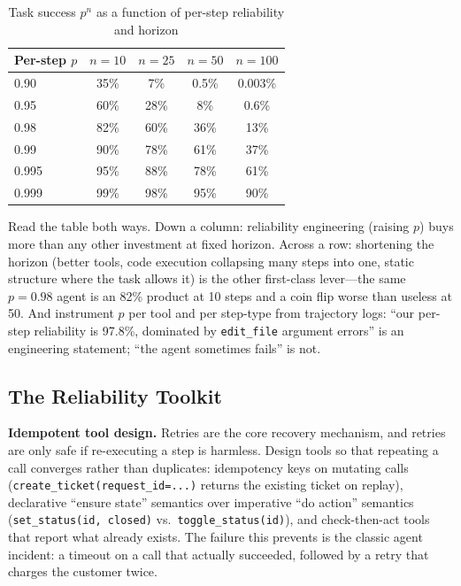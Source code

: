 \begin{table}[H]
\centering
\caption{Task success $p^n$ as a function of per-step reliability and horizon}
\label{tab:pn_grid}
\begin{tabular}{lcccc}
\toprule
\textbf{Per-step $p$} & $n=10$ & $n=25$ & $n=50$ & $n=100$ \\
\midrule
0.90 & 35\% & 7\% & 0.5\% & 0.003\% \\
0.95 & 60\% & 28\% & 8\% & 0.6\% \\
0.98 & 82\% & 60\% & 36\% & 13\% \\
0.99 & 90\% & 78\% & 61\% & 37\% \\
0.995 & 95\% & 88\% & 78\% & 61\% \\
0.999 & 99\% & 98\% & 95\% & 90\% \\
\bottomrule
\end{tabular}
\end{table}

Read the table both ways. Down a column: reliability engineering (raising $p$) buys more than any other investment at fixed horizon. Across a row: shortening the horizon (better tools, code execution collapsing many steps into one, static structure where the task allows it) is the other first-class lever---the same $p = 0.98$ agent is an 82\% product at 10 steps and a coin flip worse than useless at 50. And instrument $p$ per tool and per step-type from trajectory logs: ``our per-step reliability is 97.8\%, dominated by \texttt{edit\_file} argument errors'' is an engineering statement; ``the agent sometimes fails'' is not.

\subsection{The Reliability Toolkit}

\textbf{Idempotent tool design.} Retries are the core recovery mechanism, and retries are only safe if re-executing a step is harmless. Design tools so that repeating a call converges rather than duplicates: idempotency keys on mutating calls (\texttt{create\_ticket(request\_id=...)} returns the existing ticket on replay), declarative ``ensure state'' semantics over imperative ``do action'' semantics (\texttt{set\_status(id, closed)} vs.\ \texttt{toggle\_status(id)}), and check-then-act tools that report what already exists. The failure this prevents is the classic agent incident: a timeout on a call that actually succeeded, followed by a retry that charges the customer twice.

